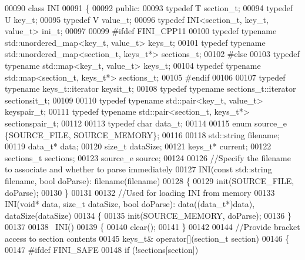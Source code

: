 \begin{DoxyCode}
00090    \textcolor{keyword}{class }INI
00091 \{
00092 \textcolor{keyword}{public}:
00093    \textcolor{keyword}{typedef} T section_t;
00094    \textcolor{keyword}{typedef} U key_t;
00095    \textcolor{keyword}{typedef} V value_t;
00096    \textcolor{keyword}{typedef} INI<section_t, key_t, value_t> ini_t;
00097 
00099 \textcolor{preprocessor}{#ifdef FINI\_CPP11}
00100    \textcolor{keyword}{typedef} \textcolor{keyword}{typename} std::unordered\_map<key\_t, value\_t> keys_t;
00101    \textcolor{keyword}{typedef} \textcolor{keyword}{typename} std::unordered\_map<section\_t, keys\_t*> sections_t;
00102 \textcolor{preprocessor}{#else}
00103    \textcolor{keyword}{typedef} \textcolor{keyword}{typename} std::map<key\_t, value\_t> keys_t;
00104    \textcolor{keyword}{typedef} \textcolor{keyword}{typename} std::map<section\_t, keys\_t*> sections_t;
00105 \textcolor{preprocessor}{#endif}
00106 
00107    \textcolor{keyword}{typedef} \textcolor{keyword}{typename} keys\_t::iterator keysit_t;
00108    \textcolor{keyword}{typedef} \textcolor{keyword}{typename} sections\_t::iterator sectionsit_t;
00109 
00110    \textcolor{keyword}{typedef} \textcolor{keyword}{typename} std::pair<key\_t, value\_t> keyspair_t;
00111    \textcolor{keyword}{typedef} \textcolor{keyword}{typename} std::pair<section\_t, keys\_t*> sectionspair_t;
00112 
00113    \textcolor{keyword}{typedef} \textcolor{keywordtype}{char} data_t;
00114 
00115    \textcolor{keyword}{enum} source_e \{SOURCE\_FILE, SOURCE\_MEMORY\};
00116 
00118    std::string filename;
00119    data\_t* data;
00120    \textcolor{keywordtype}{size\_t} dataSize;
00121    keys\_t* current;
00122    sections\_t sections;
00123    source_e source;
00124 
00126    \textcolor{comment}{//Specify the filename to associate and whether to parse immediately}
00127    INI(\textcolor{keyword}{const} std::string filename, \textcolor{keywordtype}{bool} doParse): filename(filename)
00128    \{
00129       init(SOURCE\_FILE, doParse);
00130    \}
00131 
00132    \textcolor{comment}{//Used for loading INI from memory}
00133    INI(\textcolor{keywordtype}{void}* data, \textcolor{keywordtype}{size\_t} dataSize, \textcolor{keywordtype}{bool} doParse): data((data\_t*)data), dataSize(dataSize)
00134    \{
00135       init(SOURCE\_MEMORY, doParse);
00136    \}
00137 
00138    ~INI()
00139    \{
00140       clear();
00141    \}
00142 
00144    \textcolor{comment}{//Provide bracket access to section contents}
00145    keys\_t& operator[](section\_t section)
00146    \{
00147 \textcolor{preprocessor}{   #ifdef FINI\_SAFE}
00148      \textcolor{keywordflow}{if} (!sections[section])

\end{DoxyCode}
